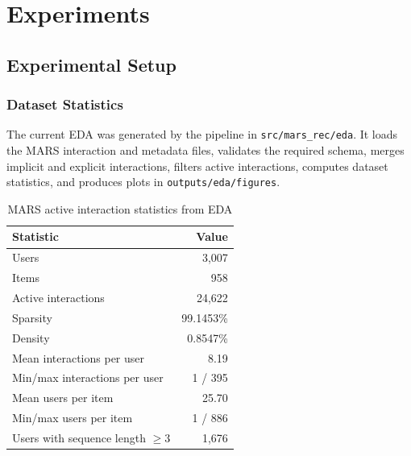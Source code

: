 
\section{Experiments}

\subsection{Experimental Setup}

\subsubsection{Dataset Statistics}

The current EDA was generated by the pipeline in \texttt{src/mars\_rec/eda}. It loads the MARS interaction and metadata files, validates the required schema, merges implicit and explicit interactions, filters active interactions, computes dataset statistics, and produces plots in \texttt{outputs/eda/figures}.

\begin{table}[H]
    \centering
    \caption{MARS active interaction statistics from EDA}
    \label{tab:eda-statistics}
    \begin{tabular}{lr}
        \toprule
        \textbf{Statistic} & \textbf{Value} \\
        \midrule
        Users & 3,007 \\
        Items & 958 \\
        Active interactions & 24,622 \\
        Sparsity & 99.1453\% \\
        Density & 0.8547\% \\
        Mean interactions per user & 8.19 \\
        Min/max interactions per user & 1 / 395 \\
        Mean users per item & 25.70 \\
        Min/max users per item & 1 / 886 \\
        Users with sequence length $\geq 3$ & 1,676 \\
        \bottomrule
    \end{tabular}
\end{table}

